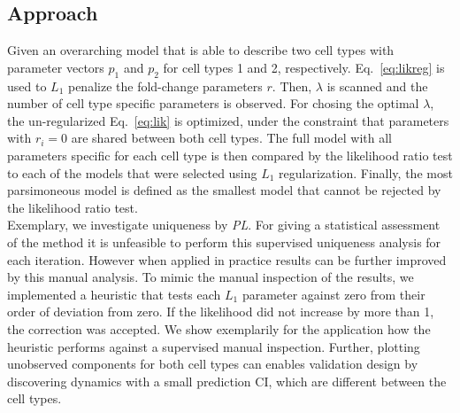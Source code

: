\documentclass{bioinfo}
\begin{document}
\begin{methods}
\section{Approach}
Given an overarching model that is able to describe two cell types with parameter vectors $p_1$ and $p_2$ for cell types 1 and 2, respectively.
Eq.~\ref{eq:likreg} is used to $L_1$ penalize the fold-change parameters $r$.
Then, $\lambda$ is scanned and the number of cell type specific parameters is observed.
For chosing the optimal $\lambda$, the un-regularized Eq.~\ref{eq:lik} is optimized, under the constraint that parameters with $r_i = 0$ are shared between both cell types.
The full model with all parameters specific for each cell type is then compared by the likelihood ratio test to each of the models that were selected using $L_1$ regularization.
Finally, the most parsimoneous model is defined as the smallest model that cannot be rejected by the likelihood ratio test.\\
Exemplary, we investigate uniqueness by \emph{PL}.
For giving a statistical assessment of the method it is unfeasible to perform this supervised uniqueness analysis for each iteration.
However when applied in practice results can be further improved by this manual analysis.
To mimic the manual inspection of the results, we implemented a heuristic that tests each $L_1$ parameter against zero from their order of deviation from zero.
If the likelihood did not increase by more than 1, the correction was accepted.
We show exemplarily for the application how the heuristic performs against a supervised manual inspection.
Further, plotting unobserved components for both cell types can enables validation design by discovering dynamics with a small prediction CI, which are different between the cell types.


\end{methods}
\end{document}
